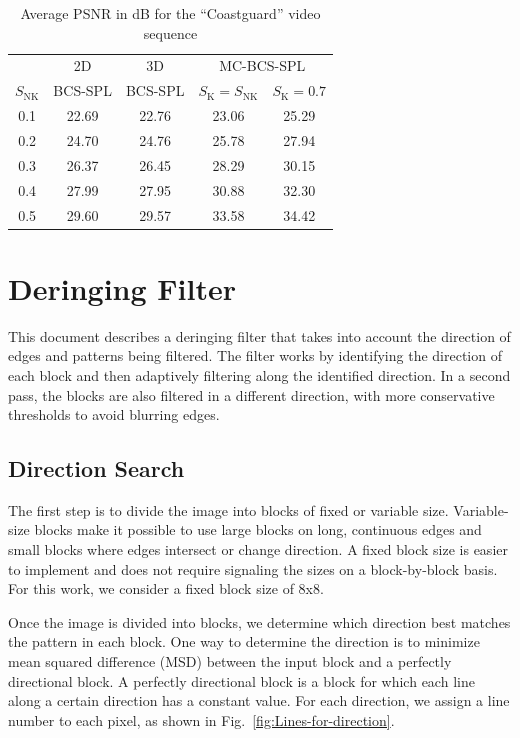 \documentclass[smallabstract,smallcaptions]{dccpaper}
\begin{document}
\begin{table}[tp]
\begin{center}
\caption{\label{tab:example}%
Average PSNR in dB for the ``Coastguard'' video sequence}
{
\renewcommand{\baselinestretch}{1}\footnotesize
\begin{tabular}{|c|c|c|c|c|}
\cline{2-5}
\multicolumn{1}{c|}{~}&
\multicolumn{1}{c|}{2D} &
\multicolumn{1}{c|}{3D} &
\multicolumn{2}{c|}{MC-BCS-SPL}\\
\cline{4-5}
\multicolumn{1}{c|}{$S_{\text{NK}}$} &
BCS-SPL & BCS-SPL & $S_{\text{K}}=S_{\text{NK}}$ & $S_{\text{K}}=0.7$\\
\hline
0.1 &22.69 &22.76 &23.06 &25.29 \\
0.2 &24.70 &24.76 &25.78 &27.94 \\
0.3 &26.37 &26.45 &28.29 &30.15 \\
0.4 &27.99 &27.95 &30.88 &32.30 \\
0.5 &29.60 &29.57 &33.58 &34.42 \\
\hline
\end{tabular}}
\end{center}
\end{table}

\section{Deringing Filter}

This document describes a deringing filter that takes into account
the direction of edges and patterns being filtered. The filter works
by identifying the direction of each block and then adaptively filtering
along the identified direction. In a second pass, the blocks are also
filtered in a different direction, with more conservative thresholds
to avoid blurring edges.

\subsection{Direction Search}

The first step is to divide the image into blocks of fixed or variable
size. Variable-size blocks make it possible to use large blocks on
long, continuous edges and small blocks where edges intersect or change
direction. A fixed block size is easier to implement and does not
require signaling the sizes on a block-by-block basis. For this work,
we consider a fixed block size of 8x8.

Once the image is divided into blocks, we determine which direction
best matches the pattern in each block. One way to determine the direction
is to minimize mean squared difference (MSD) between the input block
and a perfectly directional block. A perfectly directional block is
a block for which each line along a certain direction has a constant
value. For each direction, we assign a line number to each pixel,
as shown in Fig.~\ref{fig:Lines-for-direction}.
\end{document}
